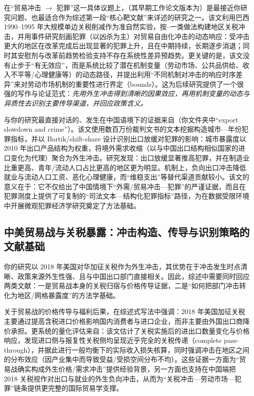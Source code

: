 在“贸易冲击 $\rightarrow$ 犯罪”这一具体议题上，\citet{dixcarneirosoaresulyssea2018economic}（其早期工作论文版本为\citealp{dixcarneirosoaresulyssea2017economic}）是最接近你研究问题、也最适合作为综述第一段“核心靶文献”来详述的研究之一。该文利用巴西 1990--1995 年大规模单边关税削减作为准自然实验，按\citeauthor{topalova2010}--\citeauthor{kovak2013}一类做法构建地区关税冲击，并用事件研究刻画犯罪（以凶杀为主）对贸易自由化冲击的动态响应：受冲击更大的地区在改革完成后出现显著的犯罪上升，且在中期持续，长期逐步消退；同时其安慰剂与改革前趋势检验支持不存在系统性差异预趋势。更关键的是，该文没有止步于“有无效应”，而是系统比较了潜在机制变量（劳动市场、公共品供给、收入不平等/心理健康等）的动态路径，并提出利用“不同机制对冲击的响应时序差异”来对劳动市场机制的重要性进行界定（bounds）。这为后续研究提供了一个很强的写作与论证范式：\emph{先用外生冲击得到清晰的因果效应，再用机制变量的动态与异质性去识别主要传导渠道，并回应政策含义。}

与你的研究最直接对话的、发生在中国语境下的证据来自\citet{ma2025export}（你文件夹中“export slowdown and crime”）。该文使用数百万份裁判文书的文本挖掘构造城市—年份犯罪指标，并以 Bartik/shift-share 设计识别出口放缓对犯罪的影响：城市暴露度以 2010 年出口产品结构为权重，将境外需求收缩（以与中国出口结构相似国家的进口变化为代理）聚合为外生冲击。研究发现：出口放缓显著推高犯罪，并在制造业比重更高、青年/流动人口占比更高的地区更为明显。机制上，负向出口冲击降低就业与流动人口工资、恶化心理健康，而“维稳支出”等替代渠道贡献较小。该文的意义在于：它不仅给出了中国情境下“外需/贸易冲击—犯罪”的严谨证据，而且在犯罪测度上提供了可复制的“司法文本—结构化犯罪指标”路径，为在数据受限环境中开展微观犯罪经济学研究奠定了方法基础。

\subsection{中美贸易战与关税暴露：冲击构造、传导与识别策略的文献基础}
\label{subsec:tariff_exposure_cn}

你的研究以 2018 年美国对华加征关税作为外生冲击，其优势在于冲击发生时点清晰、政策来源外生性强、且与中国出口部门直接相关。因此，综述中需要同时回应两类文献：一是贸易战本身的关税归宿与价格传导证据，二是“如何把部门冲击转化为地区/网格暴露度”的方法学基础。

关于贸易战的价格传导与福利后果，\citet{amiti2019impact}在综述式写法中强调：2018 年美国加征关税主要通过提高含税进口价格影响国内消费者与进口企业，而非主要由外国出口商降价承担。更系统的量化评估来自\citet{fajgelbaum2020return}：该文估计了关税实施后的进出口数量变化与价格响应，发现进口侧与报复性关税侧均呈现近乎完全的关税传递（complete pass-through），并据此进行一般均衡下的实际收入损失核算，同时强调冲击在地区之间的分布效应（因产业集中而导致受益/受损空间分布不均）。这些证据一方面为“贸易战确实构成外生价格/需求冲击”提供经验背景，另一方面也支持在中国端把 2018 关税视作对出口与就业的外生负向冲击，从而为“关税冲击—劳动市场—犯罪”链条提供更完整的国际贸易学支撑。

